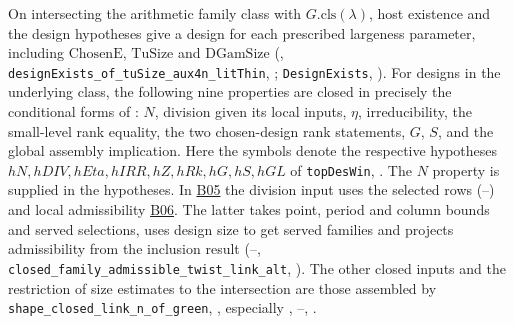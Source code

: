 \begin{formalstatement}
On intersecting the arithmetic family class with $G.\mathrm{cls}(\lambda)$,
host existence and the design hypotheses give a design for each prescribed
largeness parameter, including $\mathrm{ChosenE}$, $\mathrm{TuSize}$ and
$\mathrm{DGamSize}$ (, \nolinkurl{designExists_of_tuSize_aux4n_litThin},
; \nolinkurl{DesignExists},
).
For designs in the underlying class, the following nine properties are
closed in precisely the conditional forms of :
$N$, division given its local inputs, $\eta$, irreducibility, the
small-level rank equality, the two chosen-design rank statements,
$G$, $S$, and the global assembly implication. Here the symbols denote
the respective hypotheses $hN,hDIV,hEta,hIRR,hZ,hRk,hG,hS,hGL$ of
\nolinkurl{topDesWin}, .
The $N$ property is supplied in the hypotheses. In \hyperref[sub:B05]{B05}
the division input uses the selected rows (--)
and local admissibility \hyperref[sub:B06]{B06}. The latter takes point,
period and column bounds and served selections, uses design size to get
served families and projects admissibility from the inclusion result
(--,
\nolinkurl{closed_family_admissible_twist_link_alt},
).
The other closed inputs and the restriction of size estimates to the
intersection are those assembled by \nolinkurl{shape_closed_link_n_of_green},
, especially
, --, .
\end{formalstatement}

